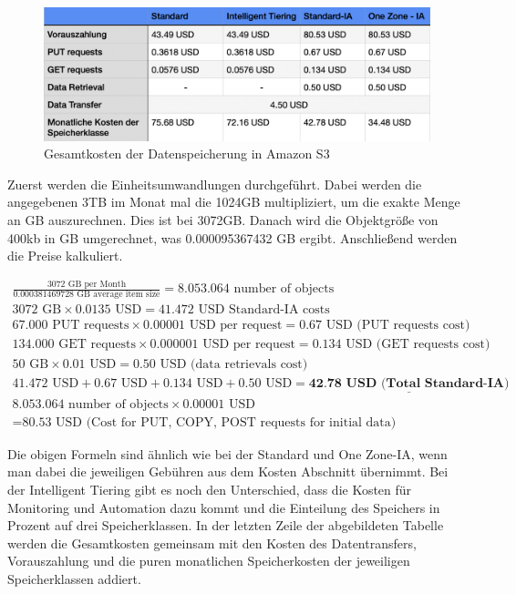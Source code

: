 \begin{figure}[h]
\centering
\includegraphics[width=12cm,keepaspectratio]{Pictures/AWSKostenOhneGesamt.png}
\caption{Gesamtkosten der Datenspeicherung in Amazon S3}	
\end{figure}

Zuerst werden die Einheitsumwandlungen durchgeführt. Dabei werden die angegebenen 3TB im Monat mal die 1024GB multipliziert, um die exakte Menge an GB auszurechnen. Dies ist bei 3072GB. Danach wird die Objektgröße von 400kb in GB umgerechnet, was 0.000095367432 GB ergibt. Anschließend werden die Preise kalkuliert. 

\newpage

\begin{align}
	\frac{3072 \text{ GB per Month}}{0.000381469728 \text{ GB average item size}} = 8.053.064 \text{ number of objects}\\
	3072 \text{ GB} \times 0.0135 \text{ USD} = \text{41.472 USD Standard-IA costs}\\
	67.000 \text{ PUT requests} \times 0.00001 \text{ USD per request} = 0.67 \text{ USD (PUT requests cost)}\\
	134.000 \text{ GET requests} \times 0.000001 \text{ USD per request} = 0.134 \text{ USD (GET requests cost)}\\
	50 \text{ GB} \times 0.01 \text{ USD} = 0.50 \text{ USD (data retrievals cost)}\\
	41.472 \text{ USD} + 0.67 \text{ USD} + 0.134 \text{ USD} + 0.50 \text{ USD} = \underline{\textbf{42.78  USD (Total Standard-IA)}}\\
	8.053.064 \text{ number of objects} \times 0.00001 \text{ USD} \\ = \text{80.53 USD (Cost for PUT, COPY, POST requests for initial data)}
\end{align}

Die obigen Formeln sind ähnlich wie bei der Standard und One Zone-IA, wenn man dabei die jeweiligen Gebühren aus dem Kosten Abschnitt übernimmt. Bei der Intelligent Tiering gibt es noch den Unterschied, dass die Kosten für Monitoring und Automation dazu kommt und die Einteilung des Speichers in Prozent auf drei Speicherklassen. In der letzten Zeile der abgebildeten Tabelle werden die Gesamtkosten gemeinsam mit den Kosten des Datentransfers, Vorauszahlung und die puren monatlichen Speicherkosten der jeweiligen Speicherklassen addiert.\\

